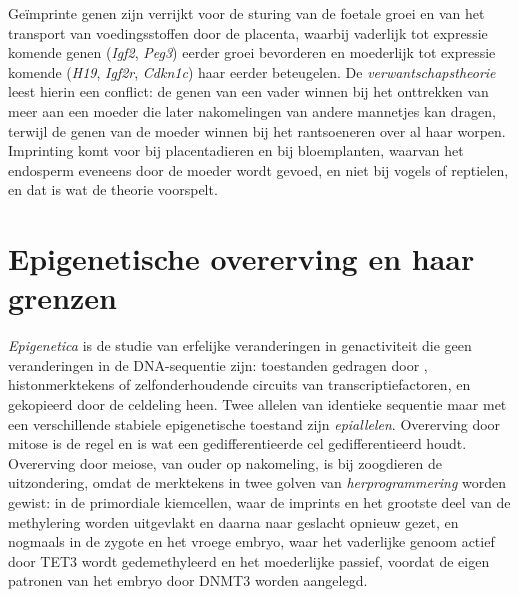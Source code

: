 \begin{remark}\label{rem:b3:chromatin-epigenetics:kinship}
Geïmprinte genen zijn verrijkt voor de sturing van de foetale groei en
van het transport van voedingsstoffen door de placenta, waarbij
vaderlijk tot expressie komende genen (\emph{Igf2}, \emph{Peg3})
eerder groei bevorderen en moederlijk tot expressie komende
(\emph{H19}, \emph{Igf2r}, \emph{Cdkn1c}) haar eerder beteugelen. De
\emph{verwantschapstheorie} leest hierin een conflict: de genen van
een vader winnen bij het onttrekken van meer aan een moeder die later
nakomelingen van andere mannetjes kan dragen, terwijl de genen van de
moeder winnen bij het rantsoeneren over al haar worpen. Imprinting
komt voor bij placentadieren en bij bloemplanten, waarvan het
endosperm eveneens door de moeder wordt gevoed, en niet bij vogels of
reptielen, en dat is wat de theorie voorspelt.
\end{remark}

\section{Epigenetische overerving en haar grenzen}

\begin{definition}[Epigenetica]\label{def:b3:chromatin-epigenetics:epigenetics}
\emph{Epigenetica} is de studie van erfelijke veranderingen in
genactiviteit die geen veranderingen in de DNA-sequentie zijn:
toestanden gedragen door , histonmerktekens of
zelfonderhoudende circuits van transcriptiefactoren, en gekopieerd
door de celdeling heen. Twee allelen van identieke sequentie maar met
een verschillende stabiele epigenetische toestand zijn
\emph{epiallelen}. Overerving door mitose is de regel en is wat een
gedifferentieerde cel gedifferentieerd houdt. Overerving door meiose,
van ouder op nakomeling, is bij zoogdieren de uitzondering, omdat de
merktekens in twee golven van \emph{herprogrammering} worden gewist:
in de primordiale kiemcellen, waar de imprints en het grootste deel
van de methylering worden uitgevlakt en daarna naar geslacht opnieuw
gezet, en nogmaals in de zygote en het vroege embryo, waar het
vaderlijke genoom actief door TET3 wordt gedemethyleerd en het
moederlijke passief, voordat de eigen patronen van het embryo door
DNMT3 worden aangelegd.
\end{definition}

